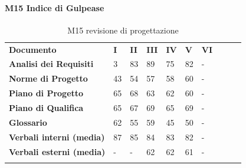 \paragraph{M15 Indice di Gulpease} \mbox{}
\begin{longtable} {						
		>{}p{50mm}  		
		>{}p{8mm}		
		>{}p{8mm}		
		>{}p{8mm}		
		>{}p{8mm}		
		>{}p{8mm}		
		>{}p{8mm}
		>{}p{8mm}
		>{}p{8mm}
		>{}p{8mm}				
	}			
	\rowcolor{gray!50}
	\textbf{Documento} & \textbf{I} & \textbf{II} & \textbf{III} & \textbf{IV} & \textbf{V} & \textbf{VI} \TBstrut \\ [2mm]
	\textbf{Analisi dei Requisiti} & 3 & 83 & 89 & 75 & 82 & - \TBstrut \\ [2mm]
	\textbf{Norme di Progetto} & 43 & 54 & 57 & 58 & 60 & - \TBstrut \\ [2mm]
	\textbf{Piano di Progetto} & 65 & 68 & 63 & 62 & 60 & - \TBstrut \\ [2mm]
	\textbf{Piano di Qualifica} & 65 & 67 & 69 & 65 & 69 & - \TBstrut \\ [2mm]
	\textbf{Glossario} & 62 & 55 & 59 & 45 & 50 & - \TBstrut \\ [2mm]
	\textbf{Verbali interni (media)} & 87 & 85 & 84 & 83 & 82 & - \TBstrut \\ [2mm]
	\textbf{Verbali esterni (media)} & - & - & 62 & 62 & 61 & - \TBstrut \\ [2mm]
	\rowcolor{white}
	\caption{M15 revisione di progettazione\glo}
\end{longtable}

